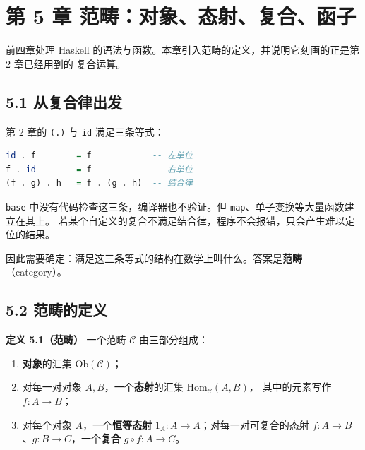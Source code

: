 \chapter{第 5 章 范畴：对象、态射、复合、函子}\label{ux7b2c-5-ux7ae0-ux8303ux7574ux5bf9ux8c61ux6001ux5c04ux590dux5408ux51fdux5b50}

前四章处理 Haskell 的语法与函数。本章引入范畴的定义，并说明它刻画的正是第 2 章已经用到的
复合运算。

\section{5.1 从复合律出发}\label{ux4eceux590dux5408ux5f8bux51faux53d1}

第 2 章的 \passthrough{\lstinline!(.)!} 与 \passthrough{\lstinline!id!} 满足三条等式：

\begin{lstlisting}[language=Haskell]
id . f        = f            -- 左单位
f . id        = f            -- 右单位
(f . g) . h   = f . (g . h)  -- 结合律
\end{lstlisting}

\passthrough{\lstinline!base!} 中没有代码检查这三条，编译器也不验证。但 \passthrough{\lstinline!map!}、单子变换等大量函数建立在其上。
若某个自定义的复合不满足结合律，程序不会报错，只会产生难以定位的结果。

因此需要确定：满足这三条等式的结构在数学上叫什么。答案是\textbf{范畴}（category）。

\section{5.2 范畴的定义}\label{ux8303ux7574ux7684ux5b9aux4e49}

\textbf{定义 5.1（范畴）} 一个范畴 \(\mathcal{C}\) 由三部分组成：

\begin{enumerate}
\def\labelenumi{\arabic{enumi}.}
\tightlist
\item
  \textbf{对象}的汇集 \(\mathrm{Ob}(\mathcal{C})\)；
\item
  对每一对对象 \(A, B\)，一个\textbf{态射}的汇集 \(\mathrm{Hom}_{\mathcal{C}}(A, B)\)，
  其中的元素写作 \(f \colon A \to B\)；
\item
  对每个对象 \(A\)，一个\textbf{恒等态射} \(1_A \colon A \to A\)；对每一对可复合的态射
  \(f \colon A \to B\)、\(g \colon B \to C\)，一个\textbf{复合} \(g \circ f \colon A \to C\)。
\end{enumerate}

